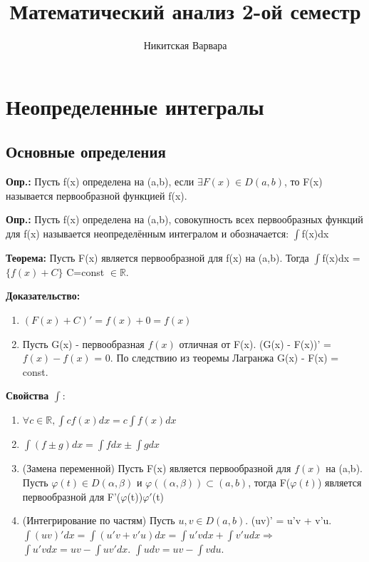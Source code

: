 \documentclass[12pt]{article}
\title{Математический анализ 2-ой семестр}
\author{Никитская Варвара}
\begin{document}
\tableofcontents
\newpage
\section{Неопределенные интегралы}

\subsection{Основные определения}

\quad\textbf{ Опр.:} Пусть f(x) определена на (a,b), если $\exists F(x) \in D(a,b)$, то F(x) называется первообразной функцией f(x).

\vspace{\baselineskip}

\textbf{Опр.:} Пусть f(x) определена на (a,b), совокупность всех первообразных функций для f(x) называется неопределённым интегралом и обозначается: $\int$f(x)dx

\vspace{\baselineskip}

\textbf{Теорема:} Пусть F(x) является первообразной для f(x) на (a,b). Тогда $\int$f(x)dx = $\{ f(x) + C \}$ C=const $\in \mathbb{R}$.\newline

\textbf{Доказательство:}
\begin{enumerate} 
\item $(F(x) + C)' = f(x) + 0 = f(x)$  
\item Пусть G(x) - первообразная $f(x)$ отличная от F(x). (G(x) - F(x))' = $f(x) - f(x)$ = 0. По следствию из теоремы Лагранжа G(x) - F(x) = const.
\end{enumerate}

\textbf{Свойства $\int$}:
\begin{enumerate}
\item $\forall c\in\mathbb{R}, \int cf(x)dx=c\int f(x)dx$ 
\item $\int (f\pm g)dx = \int fdx\pm\int gdx$
\item (Замена переменной) Пусть F(x) является первообразной для $f(x)$ на (a,b). Пусть $\varphi (t) \in D(\alpha ,\beta )$ и $\varphi ((\alpha ,\beta )) \subset (a,b)$, тогда F($\varphi (t)$) является первообразной для F'($\varphi$(t))$\varphi '$(t)
\item (Интегрирование по частям) Пусть $u,v \in D(a,b).$ (uv)' = u'v + v'u. $\int (uv)'dx = \int (u'v + v'u)dx = \int u'vdx + \int v'udx \Rightarrow$ $\int u'vdx = uv - \int uv'dx$. \newline $\int udv = uv - \int vdu$. 
\end{enumerate}
\end{document}
